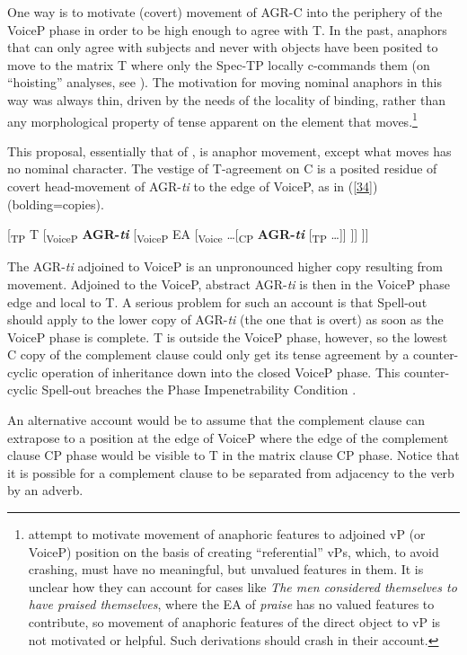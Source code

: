 \documentclass[output=paper,
modfonts
]{langscibook}
\begin{document}
One way is to motivate (covert) movement of AGR-C into the periphery of the VoiceP phase in order to be high enough to agree with T. In the past, anaphors that can only agree with subjects and never with objects have been posited to move to the matrix T where only the Spec-TP locally c-commands them (on ``hoisting'' analyses, see \citealt{Safir2013}). The motivation for moving nominal anaphors in this way was always thin, driven by the needs of the locality of binding, rather than any morphological property of tense apparent on the element that moves.\footnote{\citeauthor{Diercks2017a} attempt to motivate movement of anaphoric features to adjoined vP (or VoiceP) position on the basis of creating ``referential'' vPs, which, to avoid crashing, must have no meaningful, but unvalued features in them. It is unclear how they can account for cases like \textit{The men considered themselves to have praised themselves}, where the EA of \textit{praise} has no valued features to contribute, so movement of anaphoric features of the direct object to vP is not motivated or helpful. Such derivations should crash in their account.}

This proposal, essentially that of \cite{Diercks2017a}, is anaphor movement, except what moves has no nominal character. The vestige of T-agreement on C is a posited residue of covert head-movement of AGR-\textit{ti} to the edge of VoiceP, as in (\ref{34}) (bolding=copies).

\ea \label{34}
\textup{[\textsubscript{TP} T  [\textsubscript{VoiceP}} \textbf{AGR-\textit{ti}} \textup{[\textsubscript{VoiceP} EA [\textsubscript{Voice} …[\textsubscript{CP}} \textbf{AGR-\textit{ti}} \textup{[\textsubscript{TP} …]] ]] ]]}
 \z

The AGR-\textit{ti} adjoined to VoiceP is an unpronounced higher copy resulting from movement. Adjoined to the VoiceP, abstract AGR-\textit{ti} is then in the VoiceP phase edge and local to T. A serious problem for such an account is that Spell-out should apply to the lower copy of AGR-\textit{ti} (the one that is overt) as soon as the VoiceP phase is complete. T is outside the VoiceP phase, however, so the lowest C copy of the complement clause could only get its tense agreement by a counter-cyclic operation of inheritance down into the closed VoiceP phase. This counter-cyclic Spell-out breaches the Phase Impenetrability Condition \citep{Chomsky2001}.


An alternative account would be to assume that the complement clause can extrapose to a position at the edge of VoiceP where the edge of the complement clause CP phase would be visible to T in the matrix clause CP phase. Notice that it is possible for a complement clause to be separated from adjacency to the verb by an adverb.
\end{document}
